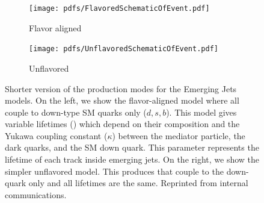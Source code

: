 \begin{figure}
	\centering
	\begin{subfigure}{.45\linewidth}
		\texttt{[image: pdfs/FlavoredSchematicOfEvent.pdf]}
		\caption{Flavor aligned}
		\label{fig:emj_prod2A}
	\end{subfigure}
	\begin{subfigure}{.45\linewidth}
		\texttt{[image: pdfs/UnflavoredSchematicOfEvent.pdf]}
		\caption{Unflavored}
	\end{subfigure}
	\caption[Shorter version of the production modes for the Emerging Jets models.]{Shorter version of the production modes for the Emerging Jets models. On the left, we show the flavor-aligned model where all \Qdark couple to down-type SM quarks only ($d, s, b$).
		This model gives \pidark variable lifetimes (\ctaudpi ) which depend on their composition and the Yukawa coupling constant ($\kappa$) between the mediator particle, the dark quarks, and the SM down quark.
		This parameter represents the lifetime of each track inside emerging jets. On the right, we show the simpler unflavored model.
		This produces \Qdark that couple to the down-quark only and all \pidark lifetimes are the same.
		Reprinted from internal communications.}
	\label{fig:emj_production2}
\end{figure}


